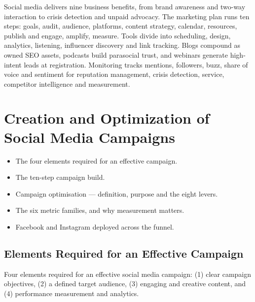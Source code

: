 \documentclass{MMTextbook}
\begin{document}
\begin{summarybox}
Social media delivers nine business benefits, from brand awareness and two-way
interaction to crisis detection and unpaid advocacy. The marketing plan runs ten
steps: goals, audit, audience, platforms, content strategy, calendar, resources,
publish and engage, amplify, measure. Tools divide into scheduling, design,
analytics, listening, influencer discovery and link tracking. Blogs compound as
owned SEO assets, podcasts build parasocial trust, and webinars generate
high-intent leads at registration. Monitoring tracks mentions, followers, buzz,
share of voice and sentiment for reputation management, crisis detection,
service, competitor intelligence and measurement.
\end{summarybox}

\chapter{Creation and Optimization of Social Media Campaigns}


\begin{learningoutcomes}
\begin{itemize}
\item The four elements required for an effective campaign.
\item The ten-step campaign build.
\item Campaign optimisation --- definition, purpose and the eight levers.
\item The six metric families, and why measurement matters.
\item Facebook and Instagram deployed across the funnel.
\end{itemize}
\end{learningoutcomes}

\section{Elements Required for an Effective Campaign}

\begin{exambox}
Four elements required for an effective social media campaign: (1) clear
campaign objectives, (2) a defined target audience, (3) engaging and creative
content, and (4) performance measurement and analytics.
\end{exambox}
\end{document}
